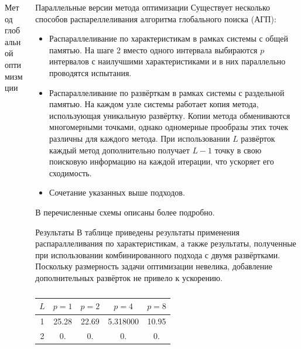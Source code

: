 \documentclass{beamer}
\begin{document}
\begin{frame}[t]
\begin{columns}[t]
\begin{column}[t]{0.48\paperwidth}
\begin{block}{Метод глобальной оптимизмции}
            \end{block}
        \end{column}
        \begin{column}[t]{0.48\paperwidth}
          \begin{block}{Параллельные версии метода оптимизации}
            Существует несколько способов распареллеливания алгоритма глобального поиска (АГП):
            \begin{itemize}
              \justifying
              \item Распараллеливание по характеристикам в рамках системы с общей памятью.
              На шаге 2 вместо одного интервала выбираются \(p\) интервалов с наилучшими характеристиками и в них параллельно проводятся испытания.
              \item Распараллеливание по развёрткам в рамках системы с раздельной памятью. На каждом узле системы работает копия метода, использующая
              уникальную развёртку. Копии метода обмениваются многомерными точками, однако одномерные прообразы этих точек различны для каждого метода.
              При использовании \(L\) развёрток каждый метод дополнительно получает \(L-1\) точку в свою поисковую информацию на каждой итерации, что
              ускоряет его сходимость.
              \item Сочетание указанных выше подходов.
            \end{itemize}
          В \cite{optParallelBook} перечисленные схемы описаны более подробно.
          \end{block}
          \begin{block}{Результаты}
            В таблице приведены результаты применения распараллеливания по характеристикам, а также
            результаты, полученные при использовании комбинированного подхода с двумя развёртками.
            Поскольку размерность задачи оптимизации невелика, добавление дополнительных развёрток не привело к ускорению.

            \begin{table}[h]
            \caption{}
            \label{tab:parallelResults}
            \begin{minipage}{0.49\linewidth}
            \begin{tabular}{c|cccc}
              $L$ & $p=1$  & $p=2$ & $p=4$ & $p=8$\\
              \hline
              1  &  25.28 & 22.69 & 5.318000 & 10.95 \\
              2  &  0. & 0. & 0. & 0. \\
              \hline
            \end{tabular}
            \end{minipage}
            \end{table}
            

\end{block}
\end{column}
\end{columns}
\end{frame}
\end{document}
